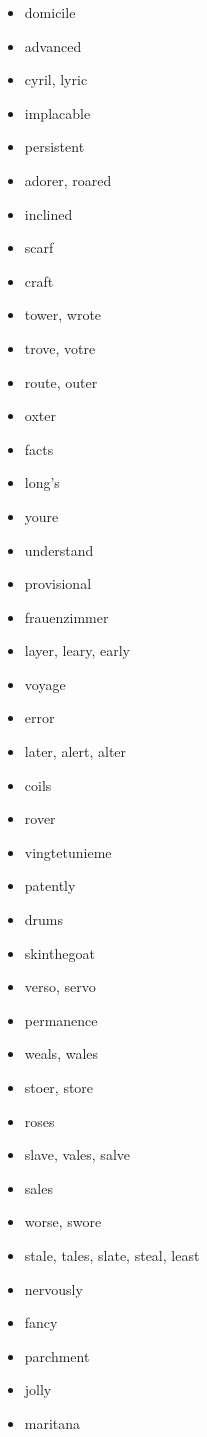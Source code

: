 \documentclass{article}
\begin{document}
\begin{itemize}
    \item domicile
    \item advanced
    \item cyril, lyric
    \item implacable
    \item persistent
    \item adorer, roared
    \item inclined
    \item scarf
    \item craft
    \item tower, wrote
    \item trove, votre
    \item route, outer
    \item oxter
    \item facts
    \item long's
    \item youre
    \item understand
    \item provisional
    \item frauenzimmer
    \item layer, leary, early
    \item voyage
    \item error
    \item later, alert, alter
    \item coils
    \item rover
    \item vingtetunieme
    \item patently
    \item drums
    \item skinthegoat
    \item verso, servo
    \item permanence
    \item weals, wales
    \item stoer, store
    \item roses
    \item slave, vales, salve
    \item sales
    \item worse, swore
    \item stale, tales, slate, steal, least
    \item nervously
    \item fancy
    \item parchment
    \item jolly
    \item maritana

\end{itemize}
\end{document}
